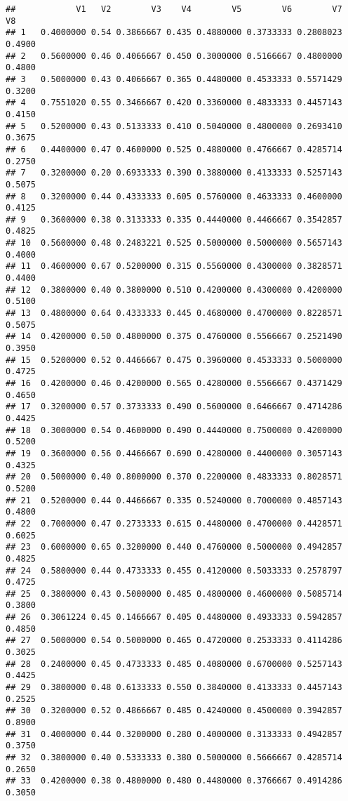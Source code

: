 \documentclass[
]{article}
\begin{document}
\begin{verbatim}
##            V1   V2        V3    V4        V5        V6        V7     V8
## 1   0.4000000 0.54 0.3866667 0.435 0.4880000 0.3733333 0.2808023 0.4900
## 2   0.5600000 0.46 0.4066667 0.450 0.3000000 0.5166667 0.4800000 0.4800
## 3   0.5000000 0.43 0.4066667 0.365 0.4480000 0.4533333 0.5571429 0.3200
## 4   0.7551020 0.55 0.3466667 0.420 0.3360000 0.4833333 0.4457143 0.4150
## 5   0.5200000 0.43 0.5133333 0.410 0.5040000 0.4800000 0.2693410 0.3675
## 6   0.4400000 0.47 0.4600000 0.525 0.4880000 0.4766667 0.4285714 0.2750
## 7   0.3200000 0.20 0.6933333 0.390 0.3880000 0.4133333 0.5257143 0.5075
## 8   0.3200000 0.44 0.4333333 0.605 0.5760000 0.4633333 0.4600000 0.4125
## 9   0.3600000 0.38 0.3133333 0.335 0.4440000 0.4466667 0.3542857 0.4825
## 10  0.5600000 0.48 0.2483221 0.525 0.5000000 0.5000000 0.5657143 0.4000
## 11  0.4600000 0.67 0.5200000 0.315 0.5560000 0.4300000 0.3828571 0.4400
## 12  0.3800000 0.40 0.3800000 0.510 0.4200000 0.4300000 0.4200000 0.5100
## 13  0.4800000 0.64 0.4333333 0.445 0.4680000 0.4700000 0.8228571 0.5075
## 14  0.4200000 0.50 0.4800000 0.375 0.4760000 0.5566667 0.2521490 0.3950
## 15  0.5200000 0.52 0.4466667 0.475 0.3960000 0.4533333 0.5000000 0.4725
## 16  0.4200000 0.46 0.4200000 0.565 0.4280000 0.5566667 0.4371429 0.4650
## 17  0.3200000 0.57 0.3733333 0.490 0.5600000 0.6466667 0.4714286 0.4425
## 18  0.3000000 0.54 0.4600000 0.490 0.4440000 0.7500000 0.4200000 0.5200
## 19  0.3600000 0.56 0.4466667 0.690 0.4280000 0.4400000 0.3057143 0.4325
## 20  0.5000000 0.40 0.8000000 0.370 0.2200000 0.4833333 0.8028571 0.5200
## 21  0.5200000 0.44 0.4466667 0.335 0.5240000 0.7000000 0.4857143 0.4800
## 22  0.7000000 0.47 0.2733333 0.615 0.4480000 0.4700000 0.4428571 0.6025
## 23  0.6000000 0.65 0.3200000 0.440 0.4760000 0.5000000 0.4942857 0.4825
## 24  0.5800000 0.44 0.4733333 0.455 0.4120000 0.5033333 0.2578797 0.4725
## 25  0.3800000 0.43 0.5000000 0.485 0.4800000 0.4600000 0.5085714 0.3800
## 26  0.3061224 0.45 0.1466667 0.405 0.4480000 0.4933333 0.5942857 0.4850
## 27  0.5000000 0.54 0.5000000 0.465 0.4720000 0.2533333 0.4114286 0.3025
## 28  0.2400000 0.45 0.4733333 0.485 0.4080000 0.6700000 0.5257143 0.4425
## 29  0.3800000 0.48 0.6133333 0.550 0.3840000 0.4133333 0.4457143 0.2525
## 30  0.3200000 0.52 0.4866667 0.485 0.4240000 0.4500000 0.3942857 0.8900
## 31  0.4000000 0.44 0.3200000 0.280 0.4000000 0.3133333 0.4942857 0.3750
## 32  0.3800000 0.40 0.5333333 0.380 0.5000000 0.5666667 0.4285714 0.2650
## 33  0.4200000 0.38 0.4800000 0.480 0.4480000 0.3766667 0.4914286 0.3050

\end{verbatim}
\end{document}

